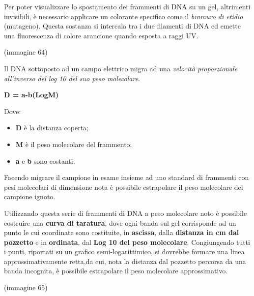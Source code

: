 \documentclass[]{article}
\begin{document}
Per poter visualizzare lo spostamento dei frammenti di DNA su un gel,
altrimenti invisibili, è necessario applicare un colorante specifico
come il \emph{bromuro di etidio} (mutageno). Questa sostanza si
intercala tra i due filamenti di DNA ed emette una fluorescenza di
colore arancione quando esposta a raggi UV.

(immagine 64)

Il DNA sottoposto ad un campo elettrico migra ad una \emph{velocità
proporzionale all'inverso del log 10 del suo peso molecolare}.

\textbf{D = a-b(LogM)}

Dove:

\begin{itemize}
\itemsep1pt\parskip0pt
\item
  \textbf{D} è la distanza coperta;
\item
  \textbf{M} è il peso molecolare del frammento;
\item
  \textbf{a} e \textbf{b} sono costanti.
\end{itemize}

Facendo migrare il campione in esame insieme ad uno standard di
frammenti con pesi molecolari di dimensione nota è possibile estrapolare
il peso molecolare del campione ignoto.

Utilizzando questa serie di frammenti di DNA a peso molecolare noto è
possibile costruire una \textbf{curva di taratura}, dove ogni banda sul
gel corrisponde ad un punto le cui coordinate sono costituite, in
\textbf{ascissa}, dalla \textbf{distanza in cm dal pozzetto} e in
\textbf{ordinata}, dal \textbf{Log 10 del peso molecolare}. Congiungendo
tutti i punti, riportati su un grafico semi-logarittimico, si dovrebbe
formare una linea approssimativamente retta,da cui, nota la distanza dal
pozzetto percorsa da una banda incognita, è possibile estrapolare il
peso molecolare approssimativo.

(immagine 65)
\end{document}
